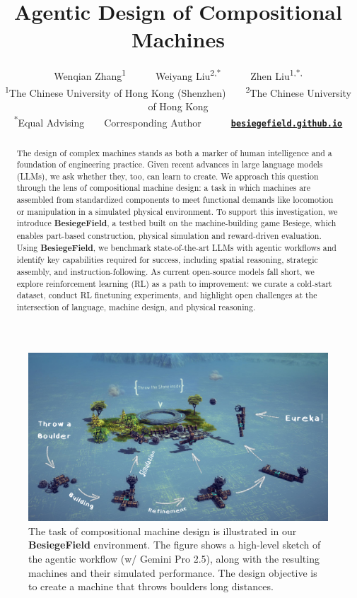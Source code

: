 \documentclass{article} %
\title{\vspace{-4mm}
Agentic Design of Compositional Machines
}
\author{
\fontsize{9.5pt}{\baselineskip}\selectfont Wenqian Zhang\textsuperscript{1}~~~~~~Weiyang Liu\textsuperscript{2,*}~~~~~~Zhen Liu\textsuperscript{1,*,\textdagger}\\[.5mm]
\fontsize{9pt}{\baselineskip}\selectfont\textsuperscript{1}The Chinese University of Hong Kong (Shenzhen)~~~~\textsuperscript{2}The Chinese University of Hong Kong\\
\fontsize{9pt}{\baselineskip}\selectfont\textsuperscript{*}Equal Advising~~~~\textsuperscript{\textdagger}Corresponding Author~~~~~~{\tt\href{https://besiegefield.github.io/}{\textbf{besiegefield.github.io}}}
}
\newcommand{\envname}{\textbf{BesiegeField}\xspace}
\theoremstyle{plain}
\theoremstyle{definition}
\begin{document}
\doparttoc %
\faketableofcontents
\maketitle


\begin{figure}[h!]
  \vspace{-3.5mm}
  \centering
  \includegraphics[width=\linewidth]{figures/teaser_final_new.pdf}
  \vspace{-5mm}
  \caption{\footnotesize The task of compositional machine design is illustrated in our \envname environment. The figure shows a high-level sketch of the agentic workflow (w/ Gemini Pro 2.5), along with the resulting machines and their simulated performance. The design objective is to create a machine that throws boulders long distances.}
  \label{fig:teaser_candidate}
  \vspace{2.5mm}
\end{figure}

\begin{abstract}
\vspace{-1.5mm}
The design of complex machines stands as both a marker of human intelligence and a foundation of engineering practice. Given recent advances in large language models (LLMs), we ask whether they, too, can learn to create. We approach this question through the lens of compositional machine design: a task in which machines are assembled from standardized components to meet functional demands like locomotion or manipulation in a simulated physical environment. To support this investigation, we introduce \envname, a testbed built on the machine-building game Besiege, which enables part-based construction, physical simulation and reward-driven evaluation. Using \envname, we benchmark state-of-the-art LLMs with agentic workflows and identify key capabilities required for success, including spatial reasoning, strategic assembly, and instruction-following. As current open-source models fall short, we explore reinforcement learning (RL) as a path to improvement: we curate a cold-start dataset, conduct RL finetuning experiments, and highlight open challenges at the intersection of language, machine design, and physical reasoning.
\end{abstract}
\end{document}
